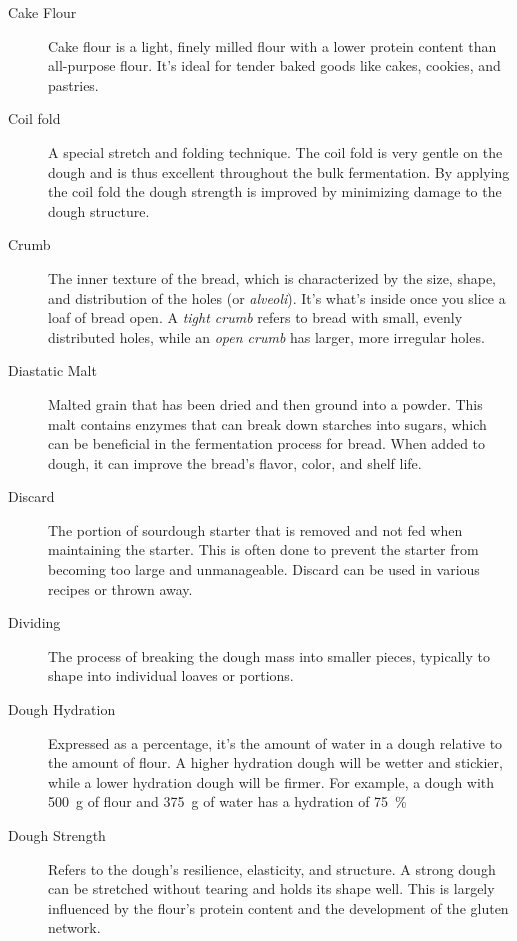 \begin{description}
\item[Cake Flour] Cake flour is a light, finely milled flour with a lower
    protein content than all-purpose flour. It's ideal for tender baked goods
    like cakes, cookies, and pastries.

\item[Coil fold] A special stretch and folding technique. The coil fold is
very gentle on the dough and is thus excellent throughout the bulk fermentation.
By applying the coil fold the dough strength is improved by minimizing damage
to the dough structure.

\item[Crumb] The inner texture of the bread, which is characterized by the size,
shape, and distribution of the holes (or \emph{alveoli}). It's what's inside once you slice
a loaf of bread open. A \emph{tight crumb} refers to bread with small, evenly distributed
holes, while an \emph{open crumb} has larger, more irregular holes.

\item[Diastatic Malt] Malted grain that has been dried and then ground into a powder.
This malt contains enzymes that can break down starches into sugars, which can be
beneficial in the fermentation process for bread. When added to dough, it can improve
the bread's flavor, color, and shelf life.

\item[Discard] The portion of sourdough starter that is removed and not fed when
maintaining the starter. This is often done to prevent the starter from becoming too
large and unmanageable. Discard can be used in various recipes or thrown away.

\item[Dividing] The process of breaking the dough mass into smaller pieces,
typically to shape into individual loaves or portions.

\item[Dough Hydration] Expressed as a percentage, it's the amount of water in a
dough relative to the amount of flour. A higher hydration dough will be wetter and
stickier, while a lower hydration dough will be firmer. For example, a dough
with \SI{500}{\gram} of flour and \SI{375}{\gram} of water has a hydration of
\SI{75}{\percent}

\item[Dough Strength] Refers to the dough's resilience, elasticity, and structure.
A strong dough can be stretched without tearing and holds its shape well. This is
largely influenced by the flour's protein content and the development of the gluten
network.


\end{description}
